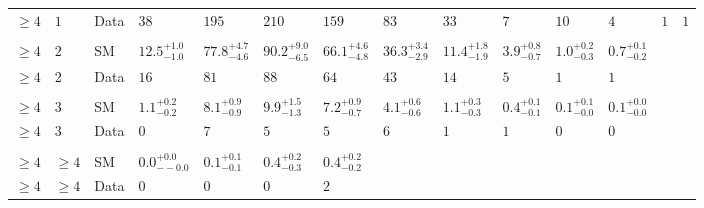 \begin{landscape}
\begin{center}
\begin{table}[h!]
\begin{tabular}{ llllllllllllll }
    $\geq 4$             & $1$      & Data & $38$                           & $195$                          & $210$                          & $159$                          & $83$                           & $33$                           & $7$                            & $10$                           & $4$                            & $1$                            & $1$                            \\\\
    $\geq 4$             & $2$      & SM   & $12.5^{+1.0}_{-1.0}$           & $77.8^{+4.7}_{-4.6}$           & $90.2^{+9.0}_{-6.5}$           & $66.1^{+4.6}_{-4.8}$           & $36.3^{+3.4}_{-2.9}$           & $11.4^{+1.8}_{-1.9}$           & $3.9^{+0.8}_{-0.7}$            & $1.0^{+0.2}_{-0.3}$            & $0.7^{+0.1}_{-0.2}$            \\ 
    $\geq 4$             & $2$      & Data & $16$                           & $81$                           & $88$                           & $64$                           & $43$                           & $14$                           & $5$                            & $1$                            & $1$                            \\\\ 
    $\geq 4$             & $3$      & SM   & $1.1^{+0.2}_{-0.2}$            & $8.1^{+0.9}_{-0.9}$            & $9.9^{+1.5}_{-1.3}$            & $7.2^{+0.9}_{-0.7}$            & $4.1^{+0.6}_{-0.6}$            & $1.1^{+0.3}_{-0.3}$            & $0.4^{+0.1}_{-0.1}$            & $0.1^{+0.1}_{-0.0}$            & $0.1^{+0.0}_{-0.0}$            \\ 
    $\geq 4$             & $3$      & Data & $0$                            & $7$                            & $5$                            & $5$                            & $6$                            & $1$                            & $1$                            & $0$                            & $0$                            \\\\ 
    $\geq 4$             & $\geq 4$ & SM   & $0.0^{+0.0}_{--0.0}$           & $0.1^{+0.1}_{-0.1}$            & $0.4^{+0.2}_{-0.3}$            & $0.4^{+0.2}_{-0.2}$  & \multicolumn{7}{l}{}                                                                                                                                         \\ 
    $\geq 4$             & $\geq 4$ & Data & $0$                            & $0$                            & $0$                            & $2$                  & \multicolumn{7}{l}{}                                                                                                                                         \\

    \hline
    \hline
  \end{tabular}
\end{table}
\end{center}
\end{landscape}


